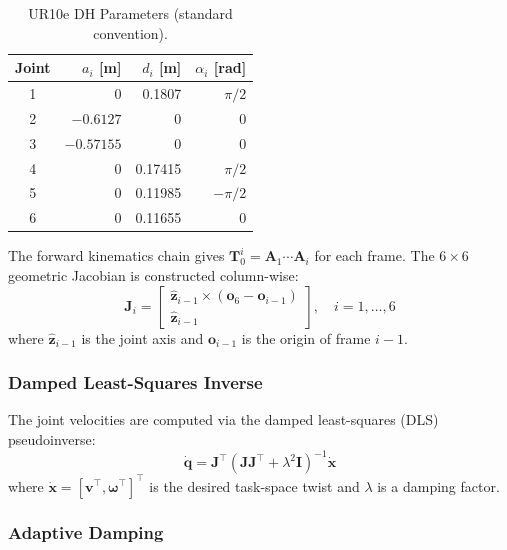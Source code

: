 \begin{table}[H]
\centering
\caption{UR10e DH Parameters (standard convention).}
\label{tab:dh}
\begin{tabular}{@{}crrr@{}}
\toprule
Joint & $a_i$ [m] & $d_i$ [m] & $\alpha_i$ [rad] \\
\midrule
1 & 0 & 0.1807 & $\pi/2$ \\
2 & $-0.6127$ & 0 & 0 \\
3 & $-0.57155$ & 0 & 0 \\
4 & 0 & 0.17415 & $\pi/2$ \\
5 & 0 & 0.11985 & $-\pi/2$ \\
6 & 0 & 0.11655 & 0 \\
\bottomrule
\end{tabular}
\end{table}

The forward kinematics chain gives $\mathbf{T}_0^i = \mathbf{A}_1 \cdots \mathbf{A}_i$ for each frame. The $6 \times 6$ geometric Jacobian is constructed column-wise:
\begin{equation}
    \mathbf{J}_i = \begin{bmatrix} \hat{\mathbf{z}}_{i-1} \times (\mathbf{o}_6 - \mathbf{o}_{i-1}) \\ \hat{\mathbf{z}}_{i-1} \end{bmatrix}, \quad i = 1, \ldots, 6
    \label{eq:jacobian}
\end{equation}
where $\hat{\mathbf{z}}_{i-1}$ is the joint axis and $\mathbf{o}_{i-1}$ is the origin of frame $i-1$.

\subsubsection{Damped Least-Squares Inverse}

The joint velocities are computed via the damped least-squares (DLS) pseudoinverse:
\begin{equation}
    \dot{\mathbf{q}} = \mathbf{J}^\top \left( \mathbf{J} \mathbf{J}^\top + \lambda^2 \mathbf{I} \right)^{-1} \dot{\mathbf{x}}
    \label{eq:dls}
\end{equation}
where $\dot{\mathbf{x}} = [\mathbf{v}^\top, \boldsymbol{\omega}^\top]^\top$ is the desired task-space twist and $\lambda$ is a damping factor.

\subsubsection{Adaptive Damping}

